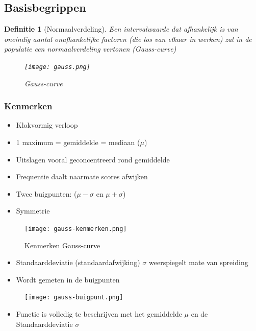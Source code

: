 \documentclass{article}
\newtheorem{theorem}{Definitie}[section]
\begin{document}
\subsection{Basisbegrippen}

\begin{theorem}[Normaalverdeling]
    Een intervalwaarde dat afhankelijk is van oneindig aantal onafhankelijke factoren (die los van elkaar in werken)
    zal in de populatie een normaalverdeling vertonen (Gauss-curve)

    \begin{figure}[H]
        \centering
        \texttt{[image: gauss.png]}
        \caption{Gauss-curve}
    \end{figure}
\end{theorem}

\subsubsection{Kenmerken}

\begin{itemize}
    \item Klokvormig verloop
    \item 1 maximum = gemiddelde = mediaan ($\mu$)
    \item Uitslagen vooral geconcentreerd rond gemiddelde
    \item Frequentie daalt naarmate scores afwijken
    \item Twee buigpunten: ($\mu - \sigma$ en $\mu + \sigma$)
    \item Symmetrie
\end{itemize}

\begin{figure}[H]
    \centering
    \texttt{[image: gauss-kenmerken.png]}
    \caption{Kenmerken Gauss-curve}
\end{figure}

\begin{itemize}
    \item Standaarddeviatie (standaardafwijking) $\sigma$ weerspiegelt mate van spreiding
    \item Wordt gemeten in de buigpunten
\end{itemize}

\begin{figure}[H]
    \centering
    \texttt{[image: gauss-buigpunt.png]}
\end{figure}

\begin{itemize}
    \item Functie is volledig te beschrijven met het gemiddelde $\mu$ en de Standaarddeviatie $\sigma$
\end{itemize}
\end{document}

